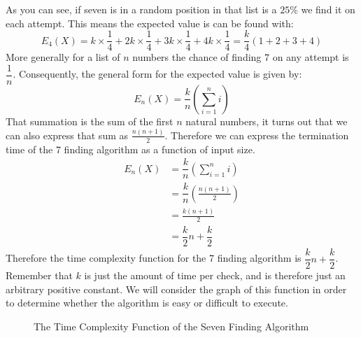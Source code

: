 \documentclass[twoside,10pt]{article}
\begin{document}
As you can see, if seven is in a random position in that list is a $25\%$ we find it on each attempt. This means the expected value is can be found with:
\begin{equation*}
    E_{4}(X)=k\times\dfrac{1}{4}+2k\times\dfrac{1}{4}+3k\times\dfrac{1}{4}+4k\times\dfrac{1}{4}=\dfrac{k}{4}\left(1+2+3+4\right)
\end{equation*}
More generally for a list of $n$ numbers the chance of finding 7 on any attempt is $\dfrac{1}{n}$. Consequently, the general form for the expected value is given by:
\[E_{n}(X)=\dfrac{k}{n}\left(\sum_{i=1}^ni\right)\]
That summation is the sum of the first $n$ natural numbers, it turns out that we can also express that sum as $\frac{n(n+1)}{2}$. Therefore we can express the termination time of the 7 finding algorithm as a function of input size.
\begin{align*}
    E_{n}(X)&=\dfrac{k}{n}\left(\sum_{i=1}^ni\right)\\
    &=\dfrac{k}{n}\left(\frac{n(n+1)}{2}\right)\\
    &=\frac{k(n+1)}{2}\\
    &=\dfrac{k}{2}n+\dfrac{k}{2}
\end{align*}
Therefore the time complexity function for the 7 finding algorithm is $\dfrac{k}{2}n+\dfrac{k}{2}$. Remember that $k$ is just the amount of time per check, and is therefore just an arbitrary positive constant. We will consider the graph of this function in order to determine whether the algorithm is easy or difficult to execute. 

\begin{figure}[h]
    \centering
    \caption{The Time Complexity Function of the Seven Finding Algorithm}
    \label{fig:lineargraph}
\end{figure}
\end{document}

